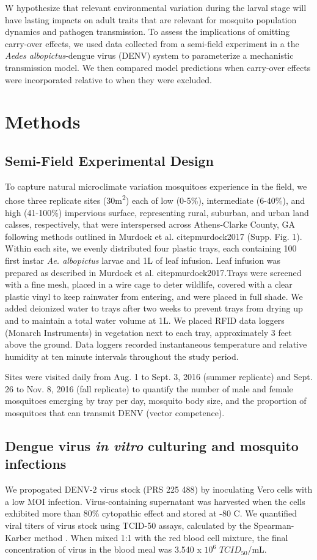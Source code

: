 \documentclass[12pt]{article}
\begin{document}
W hypothesize that relevant environmental variation during the larval stage will have lasting impacts on adult traits that are relevant for mosquito population dynamics and pathogen transmission. To assess the implications of omitting carry-over effects, we used data collected from a semi-field experiment in a the \textit{Aedes albopictus}-dengue virus (DENV) system to parameterize a mechanistic transmission model. We then compared model predictions when carry-over effects were incorporated relative to when they were excluded.

\section{Methods}
\subsection{Semi-Field Experimental Design}

To capture natural microclimate variation mosquitoes experience in the field, we chose three replicate sites (30m\textsuperscript{2}) each of low (0-5\%), intermediate (6-40\%), and high (41-100\%) impervious surface, representing rural, suburban, and urban land calsses, respectively, that were interspersed across Athens-Clarke County, GA following methods outlined in Murdock et al. citep{murdock2017} (Supp. Fig. 1). Within each site, we evenly distributed four plastic trays, each containing 100 first instar \textit{Ae. albopictus} larvae and 1L of leaf infusion. Leaf infusion was prepared as described in Murdock et al. citep{murdock2017}.Trays were screened with a fine mesh, placed in a wire cage to deter wildlife, covered with a clear plastic vinyl to keep rainwater from entering, and were placed in full shade. We added deionized water to trays after two weeks to prevent trays from drying up and to maintain a total water volume at 1L. We placed RFID data loggers (Monarch Instruments) in vegetation next to each tray, approximately 3 feet above the ground. Data loggers recorded instantaneous temperature and relative humidity at ten minute intervals throughout the study period.

Sites were visited daily from Aug. 1 to Sept. 3, 2016 (summer replicate) and Sept. 26 to Nov. 8, 2016 (fall replicate) to quantify the number of male and female mosquitoes emerging by tray per day, mosquito body size, and the proportion of mosquitoes that can transmit DENV (vector competence).

\subsection{Dengue virus \textit{in vitro} culturing and mosquito infections}
We propogated DENV-2 virus stock (PRS 225 488) by inoculating Vero cells with a low MOI infection. Virus-containing supernatant was harvested when the cells exhibited more than 80\% cytopathic effect and stored at -80 \degree C. We quantified viral titers of virus stock using TCID-50 assays, calculated by the Spearman-Karber method \citep{shao2016}. When mixed 1:1 with the red blood cell mixture, the final concentration of virus in the blood meal was 3.540 x $10^6$ $TCID_{50}$/mL.
\end{document}
